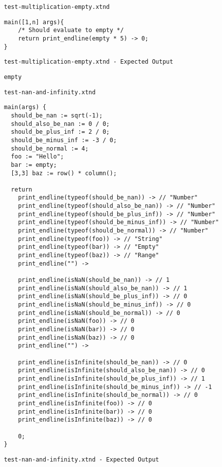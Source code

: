\medskip \noindent \texttt{test-multiplication-empty.xtnd}


\begin{lstlisting}
main([1,n] args){
	/* Should evaluate to empty */
	return print_endline(empty * 5) -> 0;
}
\end{lstlisting}


\medskip \noindent \texttt{test-multiplication-empty.xtnd - Expected Output}


\begin{lstlisting}
empty
\end{lstlisting}


\medskip \noindent \texttt{test-nan-and-infinity.xtnd}


\begin{lstlisting}
main(args) {
  should_be_nan := sqrt(-1);
  should_also_be_nan := 0 / 0;
  should_be_plus_inf := 2 / 0;
  should_be_minus_inf := -3 / 0;
  should_be_normal := 4;
  foo := "Hello";
  bar := empty;
  [3,3] baz := row() * column();

  return
    print_endline(typeof(should_be_nan)) -> // "Number"
    print_endline(typeof(should_also_be_nan)) -> // "Number"
    print_endline(typeof(should_be_plus_inf)) -> // "Number"
    print_endline(typeof(should_be_minus_inf)) -> // "Number"
    print_endline(typeof(should_be_normal)) -> // "Number"
    print_endline(typeof(foo)) -> // "String"
    print_endline(typeof(bar)) -> // "Empty"
    print_endline(typeof(baz)) -> // "Range"
    print_endline("") ->

    print_endline(isNaN(should_be_nan)) -> // 1
    print_endline(isNaN(should_also_be_nan)) -> // 1
    print_endline(isNaN(should_be_plus_inf)) -> // 0
    print_endline(isNaN(should_be_minus_inf)) -> // 0
    print_endline(isNaN(should_be_normal)) -> // 0
    print_endline(isNaN(foo)) -> // 0
    print_endline(isNaN(bar)) -> // 0
    print_endline(isNaN(baz)) -> // 0
    print_endline("") ->

    print_endline(isInfinite(should_be_nan)) -> // 0
    print_endline(isInfinite(should_also_be_nan)) -> // 0
    print_endline(isInfinite(should_be_plus_inf)) -> // 1
    print_endline(isInfinite(should_be_minus_inf)) -> // -1
    print_endline(isInfinite(should_be_normal)) -> // 0
    print_endline(isInfinite(foo)) -> // 0
    print_endline(isInfinite(bar)) -> // 0
    print_endline(isInfinite(baz)) -> // 0

    0;
}
\end{lstlisting}


\medskip \noindent \texttt{test-nan-and-infinity.xtnd - Expected Output}


